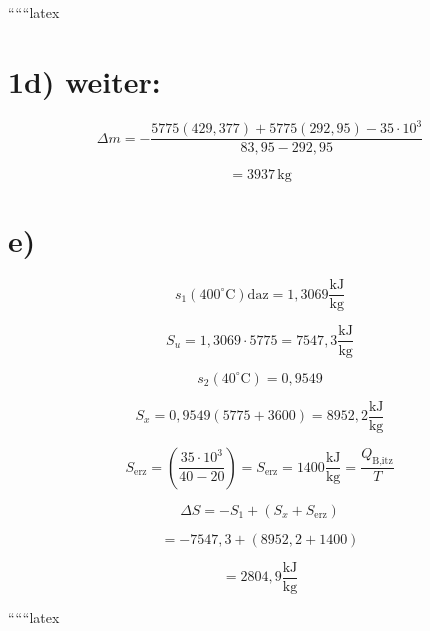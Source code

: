 ``````latex


\section*{1d) weiter:}

\[
\Delta m = - \frac{5775 (429,377) + 5775 (292,95) - 35 \cdot 10^3}{83,95 - 292,95}
\]

\[
= 3937 \, \text{kg}
\]

\section*{e)}

\[
s_1 (400^\circ \text{C}) \text{daz} = 1,3069 \frac{\text{kJ}}{\text{kg}}
\]

\[
S_u = 1,3069 \cdot 5775 = 7547,3 \frac{\text{kJ}}{\text{kg}}
\]

\[
s_2 (40^\circ \text{C}) = 0,9549
\]

\[
S_x = 0,9549 (5775 + 3600) = 8952,2 \frac{\text{kJ}}{\text{kg}}
\]

\[
S_{\text{erz}} = \left( \frac{35 \cdot 10^3}{40 - 20} \right) = S_{\text{erz}} = 1400 \frac{\text{kJ}}{\text{kg}} = \frac{Q_{\text{B,itz}}}{T}
\]

\[
\Delta S = -S_1 + (S_x + S_{\text{erz}})
\]

\[
= -7547,3 + (8952,2 + 1400)
\]

\[
= 2804,9 \frac{\text{kJ}}{\text{kg}}
\]

``````latex


